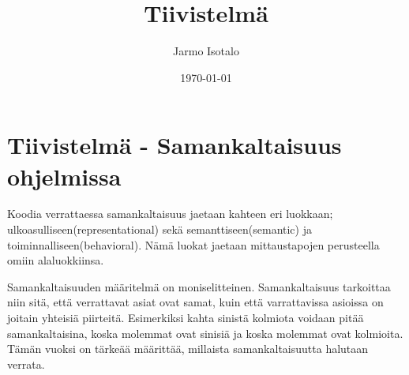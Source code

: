 \documentclass[finnish]{tktltiki2}
\title{Tiivistelmä}
\author{Jarmo Isotalo}
\date{\today}
\theoremstyle{definition}
\theoremstyle{remark}
\begin{document}

\frontmatter      %

\maketitle        %


\mainmatter
\section{Tiivistelmä - Samankaltaisuus ohjelmissa}

Koodia verrattaessa samankaltaisuus jaetaan kahteen eri luokkaan; ulkoasulliseen(representational) sekä semanttiseen(semantic) ja toiminnalliseen(behavioral). Nämä luokat jaetaan mittaustapojen perusteella omiin alaluokkiinsa.

Samankaltaisuuden määritelmä on moniselitteinen. Samankaltaisuus tarkoittaa niin sitä, että verrattavat asiat ovat samat, kuin että varrattavissa asioissa on joitain yhteisiä piirteitä. Esimerkiksi kahta sinistä kolmiota voidaan pitää samankaltaisina, koska molemmat ovat sinisiä ja koska molemmat ovat kolmioita. Tämän vuoksi on tärkeää määrittää, millaista samankaltaisuutta halutaan verrata.
\end{document}
